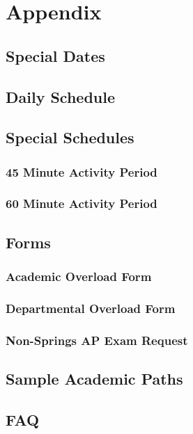 \chapter{Appendix}

\section{Special Dates}

\section{Daily Schedule}

\section{Special Schedules}

\subsection{45 Minute Activity Period}

\subsection{60 Minute Activity Period}

\section{Forms}

\subsection{Academic Overload Form}

\subsection{Departmental Overload Form}

\subsection{Non-Springs AP Exam Request}



\section{Sample Academic Paths}

\section{FAQ}


